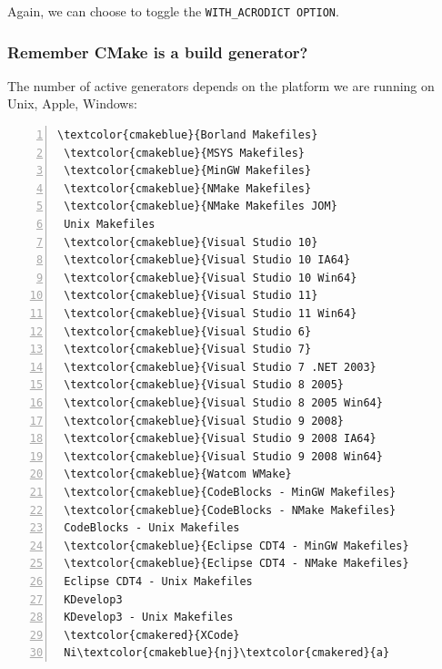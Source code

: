 \documentclass[compress,slidestop,table
              ]
               {beamer}
\begin{document}
\begin{frame}
\begin{center}
Again, we can choose to toggle the \lstinline!WITH_ACRODICT OPTION!.
\end{center}
\end{frame}

\begin{frame}[fragile]
\frametitle{Remember CMake is a build \alert{generator}?}
The number of active generators depends on the platform
we are running on {Unix}, \textcolor{cmakered}{Apple},
\textcolor{cmakeblue}{Windows}:
\begin{multicols}{2}
\begin{Verbatim}[commandchars=\\\{\},fontsize=\scriptsize,numbers=left]
 \textcolor{cmakeblue}{Borland Makefiles}
 \textcolor{cmakeblue}{MSYS Makefiles}
 \textcolor{cmakeblue}{MinGW Makefiles}
 \textcolor{cmakeblue}{NMake Makefiles}
 \textcolor{cmakeblue}{NMake Makefiles JOM}
 Unix Makefiles
 \textcolor{cmakeblue}{Visual Studio 10}
 \textcolor{cmakeblue}{Visual Studio 10 IA64}
 \textcolor{cmakeblue}{Visual Studio 10 Win64}
 \textcolor{cmakeblue}{Visual Studio 11}
 \textcolor{cmakeblue}{Visual Studio 11 Win64}
 \textcolor{cmakeblue}{Visual Studio 6}
 \textcolor{cmakeblue}{Visual Studio 7}
 \textcolor{cmakeblue}{Visual Studio 7 .NET 2003}
 \textcolor{cmakeblue}{Visual Studio 8 2005}
 \textcolor{cmakeblue}{Visual Studio 8 2005 Win64}
 \textcolor{cmakeblue}{Visual Studio 9 2008}
 \textcolor{cmakeblue}{Visual Studio 9 2008 IA64}
 \textcolor{cmakeblue}{Visual Studio 9 2008 Win64}
 \textcolor{cmakeblue}{Watcom WMake}
 \textcolor{cmakeblue}{CodeBlocks - MinGW Makefiles}
 \textcolor{cmakeblue}{CodeBlocks - NMake Makefiles}
 CodeBlocks - Unix Makefiles
 \textcolor{cmakeblue}{Eclipse CDT4 - MinGW Makefiles}
 \textcolor{cmakeblue}{Eclipse CDT4 - NMake Makefiles}
 Eclipse CDT4 - Unix Makefiles
 KDevelop3
 KDevelop3 - Unix Makefiles
 \textcolor{cmakered}{XCode}
 Ni\textcolor{cmakeblue}{nj}\textcolor{cmakered}{a}
\end{Verbatim}

\end{multicols}
\end{frame}
\end{document}
